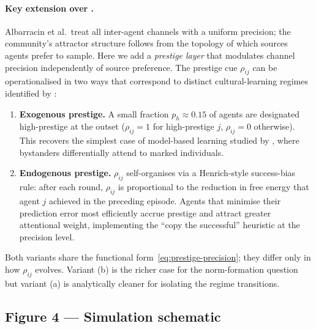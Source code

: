 \paragraph{Key extension over \citet{albarracin2022EpistemicCommunities}.}
Albarracin et al.\ treat all inter-agent channels with a uniform precision;
the community's attractor structure follows from the topology of which sources
agents prefer to sample. Here we add a \emph{prestige layer} that modulates
channel precision independently of source preference. The prestige cue
$\rho_{ij}$ can be operationalised in two ways that correspond to distinct
cultural-learning regimes identified by \citet{henrichGilWhite2001Prestige}:

\begin{enumerate}[label=(\alph*)]
  \item \textbf{Exogenous prestige.} A small fraction $p_h \approx 0.15$ of
    agents are designated high-prestige at the outset ($\rho_{ij} = 1$ for
    high-prestige $j$, $\rho_{ij} = 0$ otherwise). This recovers the simplest
    case of model-based learning studied by \citet{chudek2012BystanderGaze},
    where bystanders differentially attend to marked individuals.

  \item \textbf{Endogenous prestige.} $\rho_{ij}$ self-organises via a
    Henrich-style success-bias rule: after each round, $\rho_{ij}$ is
    proportional to the reduction in free energy that agent $j$ achieved in the
    preceding episode.  Agents that minimise their prediction error most
    efficiently accrue prestige and attract greater attentional weight,
    implementing the ``copy the successful'' heuristic at the precision level.
\end{enumerate}

Both variants share the functional form~\eqref{eq:prestige-precision}; they
differ only in how $\rho_{ij}$ evolves. Variant (b) is the richer case for
the norm-formation question but variant (a) is analytically cleaner for
isolating the regime transitions.

\subsection*{Figure 4 --- Simulation schematic}

